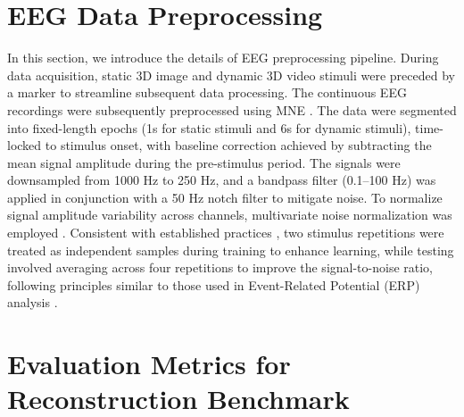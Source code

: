 
\clearpage
\setcounter{page}{1}
\maketitlesupplementary

\section{EEG Data Preprocessing}

In this section, we introduce the details of EEG preprocessing pipeline. During data acquisition, static 3D image and dynamic 3D video stimuli were preceded by a marker to streamline subsequent data processing. 
The continuous EEG recordings were subsequently preprocessed using MNE \cite{gramfort2013meg}. The data were segmented into fixed-length epochs (1s for static stimuli and 6s for dynamic stimuli), time-locked to stimulus onset, with baseline correction achieved by subtracting the mean signal amplitude during the pre-stimulus period. The signals were downsampled from 1000 Hz to 250 Hz, and a bandpass filter (0.1–100 Hz) was applied in conjunction with a 50 Hz notch filter to mitigate noise. To normalize signal amplitude variability across channels, multivariate noise normalization was employed \cite{guggenmos2018multivariate}. Consistent with established practices \cite{li2024visual}, two stimulus repetitions were treated as independent samples during training to enhance learning, while testing involved averaging across four repetitions to improve the signal-to-noise ratio, following principles similar to those used in Event-Related Potential (ERP) analysis \cite{sur2009event}.

\section{Evaluation Metrics for Reconstruction Benchmark}

